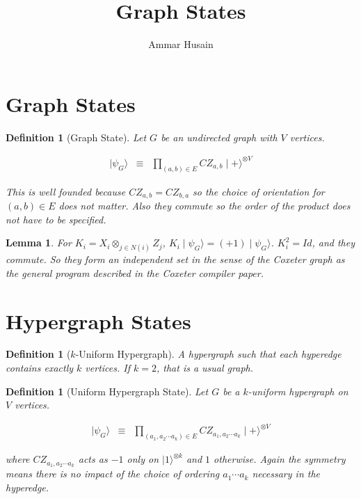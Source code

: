 \documentclass[11pt]{article}
\title{Graph States}
\author{Ammar Husain}
\theoremstyle{change}
\newtheorem{definition}[equation]{Definition}
\newtheorem{lemma}[equation]{Lemma}
\theoremstyle{nonumberplain}
\numberwithin{equation}{section}
\newcommand\ket[1]{\mid #1 \rangle}
\begin{document}
\maketitle

\section{Graph States}

\begin{definition}[Graph State]
Let $G$ be an undirected graph with $V$ vertices.

\begin{eqnarray*}
\ket{\psi_G} &\equiv& \prod_{(a,b) \in E} CZ_{a,b} \ket{+}^{\otimes V}
\end{eqnarray*}

This is well founded because $CZ_{a,b} = CZ_{b,a}$ so the choice of orientation for $(a,b) \in E$ does not matter. Also they commute so the order of the product does not have to be specified.
\end{definition}

\begin{lemma}
For $K_i = X_i \otimes_{j \in N(i)} Z_j$, $K_i \ket{\psi_G} = (+1)\ket{\psi_G}$. $K_i^2 = Id$, and they commute. So they form an independent set in the sense of the Coxeter graph as the general program described in the Coxeter compiler paper.
\end{lemma}

\section{Hypergraph States}

\begin{definition}[$k$-Uniform Hypergraph]
A hypergraph such that each hyperedge contains exactly $k$ vertices. If $k=2$, that is a usual graph.
\end{definition}

\begin{definition}[Uniform Hypergraph State]
Let $G$ be a $k$-uniform hypergraph on $V$ vertices.

\begin{eqnarray*}
\ket{\psi_G} &\equiv& \prod_{(a_1,a_2 \cdots a_k) \in E} CZ_{a_1,a_2 \cdots a_k} \ket{+}^{\otimes V}
\end{eqnarray*}

where $CZ_{a_1,a_2 \cdots a_k}$ acts as $-1$ only on $\ket{1}^{\otimes k}$ and $1$ otherwise. Again the symmetry means there is no impact of the choice of ordering $a_1 \cdots a_k$ necessary in the hyperedge.

\end{definition}
\end{document}
